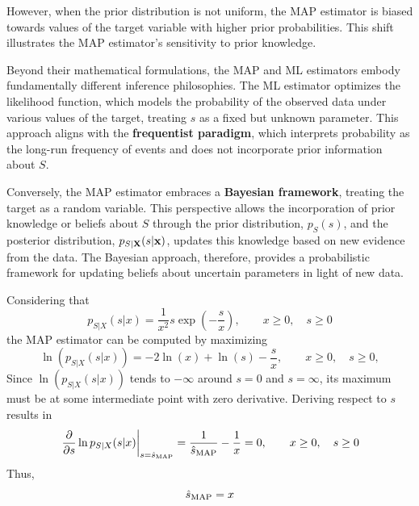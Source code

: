{However, when the prior distribution is not uniform, the MAP estimator is biased towards values of the target variable with higher prior probabilities. This shift illustrates the MAP estimator's sensitivity to prior knowledge.}

{Beyond their mathematical formulations, the MAP and ML estimators embody fundamentally different inference philosophies. The ML estimator optimizes the likelihood function, which models the probability of the observed data under various values of the target, treating $s$ as a fixed but unknown parameter. This approach aligns with the \textbf{frequentist paradigm}, which interprets probability as the long-run frequency of events and does not incorporate prior information about $S$.}

{Conversely, the MAP estimator embraces a \textbf{Bayesian framework}, treating the target as a random variable. This perspective allows the incorporation of prior knowledge or beliefs about $S$ through the prior distribution, $p_S(s)$, and the posterior distribution, $p_{{S|\bf X}}(s|{\bf x})$, updates this knowledge based on new evidence from the data. The Bayesian approach, therefore, provides a probabilistic framework for updating beliefs about uncertain parameters in light of new data.}

\begin{example}
Considering that  
\begin{equation}
p_{S|X}(s|x) = \frac{1}{x^2} s \exp\left(-\frac{s}{x}\right), \qquad  x\ge 0,\quad s \ge 0
\end{equation}
the MAP estimator can be computed by maximizing
\begin{equation}
\ln(p_{S|X}(s|x)) = -2\ln(x) + \ln(s)-\frac{s}{x}, \qquad  x\ge 0,\quad s \ge 0,
\end{equation}
Since $\ln(p_{S|X}(s|x))$ tends to $-\infty$ around $s=0 $ and $s=\infty$, its maximum must be at some intermediate point with zero derivative. Deriving respect to $s$ results in
\begin{equation}
\left.\frac{\partial}{\partial s} \ln p_{S|X}(s|x)\right|_{s=\hat{s}_\text{MAP}} 
	= \frac{1}{\hat{s}_\text{MAP}} - \frac{1}{x} 
	= 0, \qquad  x\ge 0, \quad s \ge 0
\end{equation}
Thus,
\begin{equation}
\hat{s}_\text{MAP} = x
\end{equation}
\end{example}   %

